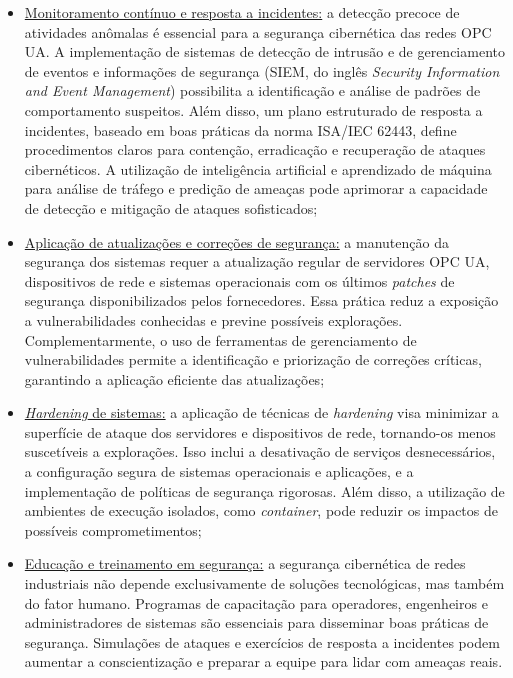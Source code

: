 \begin{itemize}
            \item \underline{Monitoramento contínuo e resposta a incidentes:} a detecção precoce de atividades anômalas é essencial para a segurança cibernética das redes OPC UA. A implementação de sistemas de detecção de intrusão e de gerenciamento de eventos e informações de segurança (SIEM, do inglês \textit{Security Information and Event Management}) possibilita a identificação e análise de padrões de comportamento suspeitos. Além disso, um plano estruturado de resposta a incidentes, baseado em boas práticas da norma ISA/IEC 62443, define procedimentos claros para contenção, erradicação e recuperação de ataques cibernéticos. A utilização de inteligência artificial e aprendizado de máquina para análise de tráfego e predição de ameaças pode aprimorar a capacidade de detecção e mitigação de ataques sofisticados;
            \item \underline{Aplicação de atualizações e correções de segurança:} a manutenção da segurança dos sistemas requer a atualização regular de servidores OPC UA, dispositivos de rede e sistemas operacionais com os últimos \textit{patches} de segurança disponibilizados pelos fornecedores. Essa prática reduz a exposição a vulnerabilidades conhecidas e previne possíveis explorações. Complementarmente, o uso de ferramentas de gerenciamento de vulnerabilidades permite a identificação e priorização de correções críticas, garantindo a aplicação eficiente das atualizações;
            \item \underline{\textit{Hardening} de sistemas:} a aplicação de técnicas de \textit{hardening} visa minimizar a superfície de ataque dos servidores e dispositivos de rede, tornando-os menos suscetíveis a explorações. Isso inclui a desativação de serviços desnecessários, a configuração segura de sistemas operacionais e aplicações, e a implementação de políticas de segurança rigorosas. Além disso, a utilização de ambientes de execução isolados, como \textit{container}, pode reduzir os impactos de possíveis comprometimentos;
            \item \underline{Educação e treinamento em segurança:} a segurança cibernética de redes industriais não depende exclusivamente de soluções tecnológicas, mas também do fator humano. Programas de capacitação para operadores, engenheiros e administradores de sistemas são essenciais para disseminar boas práticas de segurança. Simulações de ataques e exercícios de resposta a incidentes podem aumentar a conscientização e preparar a equipe para lidar com ameaças reais.
        \end{itemize}
        

